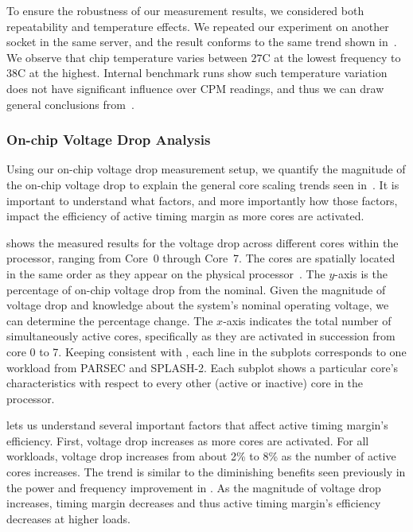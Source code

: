 To ensure the robustness of our measurement results, we considered both repeatability and temperature effects. We repeated our experiment on another socket in the same server, and the result conforms to the same trend shown in~. We observe that chip temperature varies between $27$\textdegree C at the lowest frequency to $38$\textdegree C at the highest. Internal benchmark runs show such temperature variation does not have significant influence over CPM readings, and thus we can draw general conclusions from~.

\subsubsection{On-chip Voltage Drop Analysis}
\label{sec:ams:rootcause:vdrop-analysis}

Using our on-chip voltage drop measurement setup, we quantify the magnitude of the on-chip voltage drop to explain the general core scaling trends seen in~. It is important to understand what factors, and more importantly how those factors, impact the efficiency of active timing margin as more cores are activated. 

 shows the measured results for the voltage drop across different cores within the processor, ranging from Core~0 through Core~7. The cores are spatially located in the same order as they appear on the physical processor~\cite{zyuban2013ibm}. The $y$-axis is the percentage of on-chip voltage drop from the nominal. Given the magnitude of voltage drop and knowledge about the system's nominal operating voltage, we can determine the percentage change. The $x$-axis indicates the total number of simultaneously active cores, specifically as they are activated in succession from core 0 to 7. Keeping consistent with , each line in the subplots corresponds to one workload from PARSEC and SPLASH-2. Each subplot shows a particular core's characteristics with respect to every other (active or inactive) core in the processor. 

 lets us understand several important factors that affect active timing margin's efficiency. First, voltage drop increases as more cores are activated. For all workloads, voltage drop increases from about 2\% to 8\% as the number of active cores increases. The trend is similar to the diminishing benefits seen previously in the power and frequency improvement in . As the magnitude of voltage drop increases, timing margin decreases and thus active timing margin's efficiency decreases at higher loads. 

